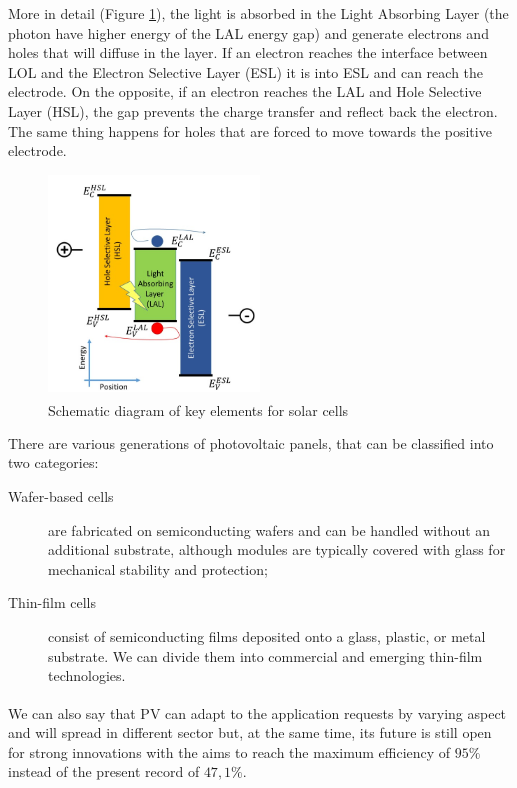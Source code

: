 More in detail (Figure \ref{fig:pv}), the light is absorbed in the Light Absorbing Layer (the photon have higher energy of the LAL energy gap) and generate electrons and holes that will diffuse in the layer. If an electron reaches the interface between LOL and the Electron Selective Layer (ESL) it is into ESL and can reach the electrode. On the opposite, if an electron reaches the LAL and Hole Selective Layer (HSL), the gap prevents the charge transfer and reflect back the electron. The same thing happens for holes that are forced to move towards the positive electrode.

\begin{figure}[h]
    \centering
    \includegraphics[width=0.5\textwidth]{Chapters/Pictures/PV_schematic_diagram.jpg}
    \caption{Schematic diagram of key elements for solar cells\textsuperscript{\cite{PV2020}}}
    \label{fig:pv}
\end{figure}
\newpage
There are various generations of photovoltaic panels, that can be classified into two categories:

\begin{description}
    \item[Wafer-based cells] are fabricated on semiconducting wafers and can be handled without an additional substrate, although modules are typically covered with glass for mechanical stability and protection;
    \item[Thin-film cells]  consist of semiconducting films deposited onto a glass, plastic, or metal substrate. We can divide them into commercial and emerging thin-film technologies.
\end{description}

We can also say\textsuperscript{\cite{PV2020}} that PV can adapt to the application requests by varying aspect and will spread in different sector but, at the same time, its future is still open for strong innovations with the aims to reach the maximum efficiency of $95\%$ instead of the present record of $47,1\%$.

